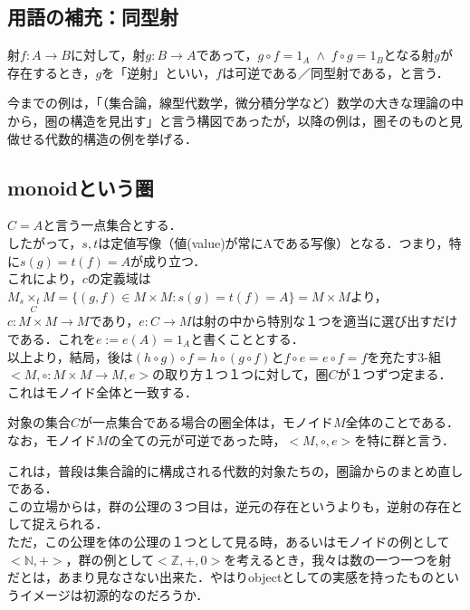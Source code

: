 \documentclass[uplatex, 12pt, a4paper, dvipdfmx]{jsarticle}
\begin{document}
\subsection{用語の補充：同型射}

\begin{shadebox}\begin{definition}[可逆，同型，逆射]
    射$f:A\longrightarrow B$に対して，射$g:B\longrightarrow A$であって，$g\circ f=1_A \; \wedge \; f\circ g=1_B$となる射$g$が存在するとき，$g$を「逆射」といい，$f$は可逆である／同型射である，と言う．
\end{definition}\end{shadebox}

今までの例は，「（集合論，線型代数学，微分積分学など）数学の大きな理論の中から，圏の構造を見出す」と言う構図であったが，以降の例は，圏そのものと見做せる代数的構造の例を挙げる．

\subsection{monoidという圏}

$C={A}$と言う一点集合とする．\\
したがって，$s,t$は定値写像（値(value)が常にAである写像）となる．つまり，特に$s(g)=t(f)=A$が成り立つ．\\
これにより，$c$の定義域は$M_s\underset{C}{\times_t}M=\{ (g,f)\in M\times M : s(g)=t(f)=A \}=M\times M$より，$c:M\times M\longrightarrow M$であり，$e:C\longrightarrow M$は射の中から特別な１つを適当に選び出すだけである．これを$e:=e(A)=1_A$と書くこととする．\\
以上より，結局，後は$(h\circ g)\circ f = h\circ (g\circ f)$と$f\circ e=e\circ f = f$を充たす3-組$<M,\circ :M\times M\longrightarrow M,e>$の取り方１つ１つに対して，圏$C$が１つずつ定まる．\\
これはモノイド全体と一致する．\\

\begin{screen}
    対象の集合$C$が一点集合である場合の圏全体は，モノイド$M$全体のことである．\\
    なお，モノイド$M$の全ての元が可逆であった時，$<M,\circ,e>$を特に群と言う．
\end{screen}

これは，普段は集合論的に構成される代数的対象たちの，圏論からのまとめ直しである．\\
この立場からは，群の公理の３つ目は，逆元の存在というよりも，逆射の存在として捉えられる．\\
ただ，この公理を体の公理の１つとして見る時，あるいはモノイドの例として$<\mathbb{N},+>$，群の例として$<\mathbb{Z},+,0>$を考えるとき，我々は数の一つ一つを射だとは，あまり見なさない出来た．やはりobjectとしての実感を持ったものというイメージは初源的なのだろうか．
\end{document}
